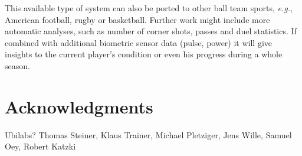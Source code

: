 \documentclass{sig-alternate}
\begin{document}
This available type of system can also be ported
to other ball team sports, \emph{e.g.}, American football,
rugby or basketball.
Further work might include more automatic analyses,
such as number of corner shots, passes and duel statistics.
If combined with additional biometric sensor data (pulse, power)
it will give insights to the current player’s condition
or even his progress during a whole season.

\section*{Acknowledgments}
Ubilabs? Thomas Steiner, Klaus Trainer, Michael Pletziger, Jens Wille, Samuel Oey, Robert Katzki



\end{document}
